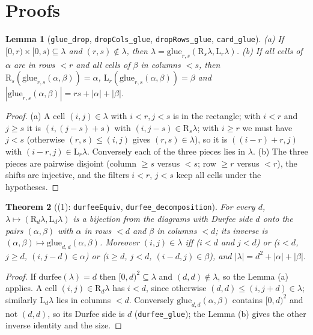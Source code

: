 \documentclass[11pt]{article}
\newtheorem{theorem}{Theorem}
\newtheorem{lemma}[theorem]{Lemma}
\theoremstyle{definition}
\newcommand{\Rt}{\mathrm{R}}
\newcommand{\Lw}{\mathrm{L}}
\begin{document}
\section{Proofs}

\begin{lemma}[\texttt{glue\_drop}, \texttt{dropCols\_glue}, \texttt{dropRows\_glue},
\texttt{card\_glue}]
(a) If $[0,r)\times[0,s)\subseteq\lambda$ and $(r,s)\notin\lambda$, then
$\lambda=\mathrm{glue}_{r,s}(\Rt_s\lambda,\Lw_r\lambda)$.
(b) If all cells of $\alpha$ are in rows $<r$ and all cells of $\beta$ in columns $<s$, then
$\Rt_s(\mathrm{glue}_{r,s}(\alpha,\beta))=\alpha$, $\Lw_r(\mathrm{glue}_{r,s}(\alpha,\beta))=\beta$
and $|\mathrm{glue}_{r,s}(\alpha,\beta)|=rs+|\alpha|+|\beta|$.
\end{lemma}
\begin{proof}
(a) A cell $(i,j)\in\lambda$ with $i<r,j<s$ is in the rectangle; with $i<r$ and $j\ge s$ it is $(i,(j-s)+s)$ with $(i,j-s)\in\Rt_s\lambda$; with $i\ge r$ we must have $j<s$
(otherwise $(r,s)\le(i,j)$ gives $(r,s)\in\lambda$), so it is $((i-r)+r,j)$ with
$(i-r,j)\in\Lw_r\lambda$. Conversely each of the three pieces lies in $\lambda$. (b) The three
pieces are pairwise disjoint (column $\ge s$ versus $<s$; row $\ge r$ versus $<r$), the shifts are
injective, and the filters $i<r$, $j<s$ keep all cells under the hypotheses.
\end{proof}

\begin{theorem}[(1): \texttt{durfeeEquiv}, \texttt{durfee\_decomposition}]
For every $d$, $\lambda\mapsto(\Rt_d\lambda,\Lw_d\lambda)$ is a bijection from the diagrams with
Durfee side $d$ onto the pairs $(\alpha,\beta)$ with $\alpha$ in rows $<d$ and $\beta$ in columns
$<d$; its inverse is $(\alpha,\beta)\mapsto\mathrm{glue}_{d,d}(\alpha,\beta)$. Moreover
$(i,j)\in\lambda$ iff ($i<d$ and $j<d$) or ($i<d$, $j\ge d$, $(i,j-d)\in\alpha$) or ($i\ge d$,
$j<d$, $(i-d,j)\in\beta$), and $|\lambda|=d^2+|\alpha|+|\beta|$.
\end{theorem}
\begin{proof}
If $\mathrm{durfee}(\lambda)=d$ then $[0,d)^2\subseteq\lambda$ and $(d,d)\notin\lambda$, so the
Lemma (a) applies. A cell $(i,j)\in\Rt_d\lambda$ has $i<d$, since otherwise
$(d,d)\le(i,j+d)\in\lambda$; similarly $\Lw_d\lambda$ lies in columns $<d$. Conversely
$\mathrm{glue}_{d,d}(\alpha,\beta)$ contains $[0,d)^2$ and not $(d,d)$, so its Durfee side is $d$
(\texttt{durfee\_glue}); the Lemma (b) gives the other inverse identity and the size.
\end{proof}
\end{document}
